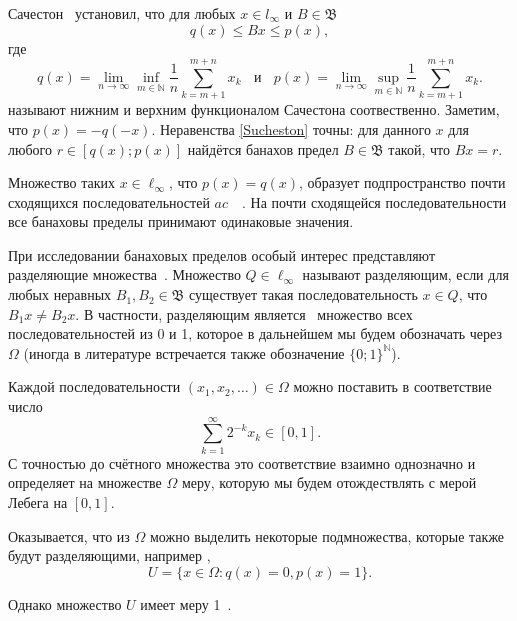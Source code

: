 \documentclass[a4paper,14pt]{article} %
\theoremstyle{plain}
\begin{document}
Сачестон~\cite{sucheston1967banach} установил, что
для любых $x\in l_\infty$ и $B\in\mathfrak{B}$
\begin{equation}\label{Sucheston}
	q(x) \leqslant Bx \leqslant p(x)
	,
\end{equation}
где
\begin{equation*}
	q(x) = \lim_{n\to\infty} \inf_{m\in\mathbb{N}}  \frac{1}{n} \sum_{k=m+1}^{m+n} x_k
	~~~~\mbox{и}~~~~
	p(x) = \lim_{n\to\infty} \sup_{m\in\mathbb{N}}  \frac{1}{n} \sum_{k=m+1}^{m+n} x_k
	.
\end{equation*}
называют нижним и верхним функционалом Сачестона соотвественно.
Заметим, что $p(x) = -q(-x)$.
Неравенства \eqref{Sucheston} точны:
для данного $x$ для любого $r\in[q(x); p(x)]$ найдётся банахов предел
$B\in\mathfrak{B}$ такой, что $Bx = r$.

Множество таких $x\in\ell_\infty$, что $p(x)=q(x)$,
образует подпространство почти сходящихся последовательностей $ac$~~\cite{lorentz1948contribution}.
На почти сходящейся последовательности все банаховы пределы принимают одинаковые значения.

При исследовании банаховых пределов особый интерес представляют разделяющие множества~\cite[\S 3]{Semenov2014geomprops}.
Множество $Q\in\ell_\infty$ называют разделяющим, если
для любых неравных $B_1, B_2\in\mathfrak{B}$ существует такая последовательность $x\in Q$,
что $B_1 x \neq B_2 x$.
В частности, разделяющим является~\cite{semenov2010characteristic} множество всех последовательностей из 0 и 1,
которое в дальнейшем мы будем обозначать через $\Omega$
(иногда в литературе встречается также обозначение $\{0;1\}^\mathbb{N}$).

Каждой последовательности $(x_1, x_2, \dots)\in \Omega$ можно поставить в соответствие число
\begin{equation}\label{eq:bijection_omega_0_1}
	\sum_{k=1}^\infty 2^{-k} x_k \in [0,1]
	.
\end{equation}
С точностью до счётного множества это соответствие взаимно однозначно и определяет на множестве $\Omega$ меру,
которую мы будем отождествлять с мерой Лебега на $[0,1]$.

Оказывается, что из $\Omega$ можно выделить некоторые подмножества, которые также будут разделяющими,
например \cite[\S 3, Теорема 11]{Semenov2014geomprops},
\begin{equation}
	U = \{ x\in\Omega: q(x) = 0, p(x) = 1 \}
	.
\end{equation}

Однако множество $U$ имеет меру 1~\cite{semenov2010characteristic}.
\end{document}
